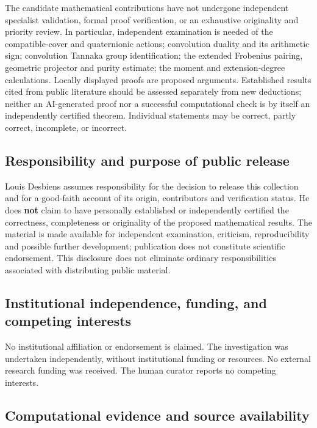 \documentclass[
  11pt,
  a4paper,
]{article}
\begin{document}
The candidate mathematical contributions have not undergone independent
specialist validation, formal proof verification, or an exhaustive
originality and priority review. In particular, independent examination
is needed of the compatible-cover and quaternionic actions; convolution
duality and its arithmetic sign; convolution Tannaka group
identification; the extended Frobenius pairing, geometric projector and purity estimate; the
moment and extension-degree calculations. Locally displayed proofs are
proposed arguments. Established results cited from public literature
should be assessed separately from new deductions; neither an
AI-generated proof nor a successful computational check is by itself an
independently certified theorem. Individual statements may be correct,
partly correct, incomplete, or incorrect.

\subsection{Responsibility and purpose of public
release}\label{responsibility-and-purpose-of-public-release}

Louis Desbiens assumes responsibility for the decision to release this
collection and for a good-faith account of its origin, contributors and
verification status. He does \textbf{not} claim to have personally
established or independently certified the correctness, completeness or
originality of the proposed mathematical results. The material is made
available for independent examination, criticism, reproducibility and
possible further development; publication does not constitute scientific
endorsement. This disclosure does not eliminate ordinary
responsibilities associated with distributing public material.

\subsection{Institutional independence, funding, and competing
interests}\label{institutional-independence-funding-and-competing-interests}

No institutional affiliation or endorsement is claimed. The
investigation was undertaken independently, without institutional
funding or resources. No external research funding was received. The
human curator reports no competing interests.

\subsection{Computational evidence and source
availability}\label{computational-evidence-and-source-availability}
\end{document}
